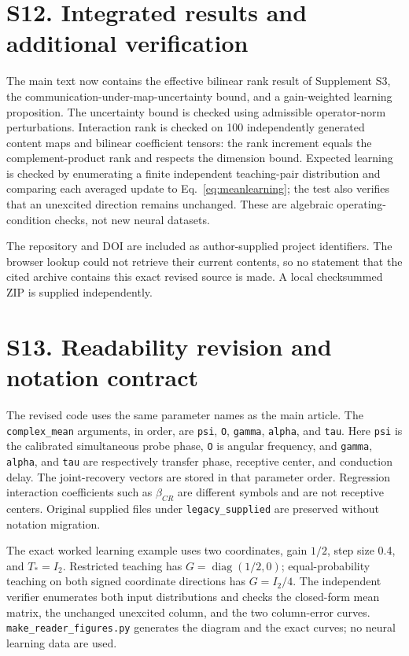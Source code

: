 \documentclass[11pt,a4paper]{article}
\begin{document}
\section*{S12. Integrated results and additional verification}
The main text now contains the effective bilinear rank result of Supplement S3, the communication-under-map-uncertainty bound, and a gain-weighted learning proposition. The uncertainty bound is checked using admissible operator-norm perturbations. Interaction rank is checked on 100 independently generated content maps and bilinear coefficient tensors: the rank increment equals the complement-product rank and respects the dimension bound. Expected learning is checked by enumerating a finite independent teaching-pair distribution and comparing each averaged update to Eq.~\ref{eq:meanlearning}; the test also verifies that an unexcited direction remains unchanged. These are algebraic operating-condition checks, not new neural datasets.

The repository and DOI are included as author-supplied project identifiers. The browser lookup could not retrieve their current contents, so no statement that the cited archive contains this exact revised source is made. A local checksummed ZIP is supplied independently.
\section*{S13. Readability revision and notation contract}
The revised code uses the same parameter names as the main article. The \texttt{complex\_mean} arguments, in order, are \texttt{psi}, \texttt{O}, \texttt{gamma}, \texttt{alpha}, and \texttt{tau}. Here \texttt{psi} is the calibrated simultaneous probe phase, \texttt{O} is angular frequency, and \texttt{gamma}, \texttt{alpha}, and \texttt{tau} are respectively transfer phase, receptive center, and conduction delay. The joint-recovery vectors are stored in that parameter order. Regression interaction coefficients such as $\beta_{CR}$ are different symbols and are not receptive centers. Original supplied files under \texttt{legacy\_supplied} are preserved without notation migration.

The exact worked learning example uses two coordinates, gain $1/2$, step size 0.4, and $T_*=I_2$. Restricted teaching has $G=\operatorname{diag}(1/2,0)$; equal-probability teaching on both signed coordinate directions has $G=I_2/4$. The independent verifier enumerates both input distributions and checks the closed-form mean matrix, the unchanged unexcited column, and the two column-error curves. \texttt{make\_reader\_figures.py} generates the diagram and the exact curves; no neural learning data are used.
\end{document}
